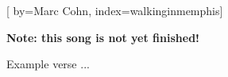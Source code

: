 

[%
    by={Marc Cohn},
    index={walkinginmemphis}]


    \label{walkinginmemphis}

    \textbf{Note: this song is not yet finished!}

    \beginverse
        Example verse ...
    \endverse
\endsong
